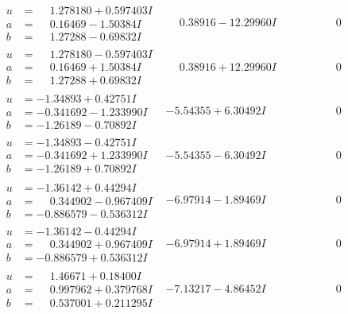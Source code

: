 \documentclass[1p]{elsarticle_modified}
\theoremstyle{definition}
\begin{document}
$$\begin{array}{c|c|c}
\begin{aligned}
u &= \phantom{-}1.278180 + 0.597403 I \\
a &= \phantom{-}0.16469 - 1.50384 I \\
b &= \phantom{-}1.27288 - 0.69832 I\end{aligned}
 & \phantom{-}0.38916 - 12.29960 I & \phantom{-0.000000 } 0 \\ \hline\begin{aligned}
u &= \phantom{-}1.278180 - 0.597403 I \\
a &= \phantom{-}0.16469 + 1.50384 I \\
b &= \phantom{-}1.27288 + 0.69832 I\end{aligned}
 & \phantom{-}0.38916 + 12.29960 I & \phantom{-0.000000 } 0 \\ \hline\begin{aligned}
u &= -1.34893 + 0.42751 I \\
a &= -0.341692 - 1.233990 I \\
b &= -1.26189 - 0.70892 I\end{aligned}
 & -5.54355 + 6.30492 I & \phantom{-0.000000 } 0 \\ \hline\begin{aligned}
u &= -1.34893 - 0.42751 I \\
a &= -0.341692 + 1.233990 I \\
b &= -1.26189 + 0.70892 I\end{aligned}
 & -5.54355 - 6.30492 I & \phantom{-0.000000 } 0 \\ \hline\begin{aligned}
u &= -1.36142 + 0.44294 I \\
a &= \phantom{-}0.344902 - 0.967409 I \\
b &= -0.886579 - 0.536312 I\end{aligned}
 & -6.97914 - 1.89469 I & \phantom{-0.000000 } 0 \\ \hline\begin{aligned}
u &= -1.36142 - 0.44294 I \\
a &= \phantom{-}0.344902 + 0.967409 I \\
b &= -0.886579 + 0.536312 I\end{aligned}
 & -6.97914 + 1.89469 I & \phantom{-0.000000 } 0 \\ \hline\begin{aligned}
u &= \phantom{-}1.46671 + 0.18400 I \\
a &= \phantom{-}0.997962 + 0.379768 I \\
b &= \phantom{-}0.537001 + 0.211295 I\end{aligned}
 & -7.13217 - 4.86452 I & \phantom{-0.000000 } 0 \\ \hline\begin{aligned}

\end{aligned}
\end{array}$$
\end{document}
